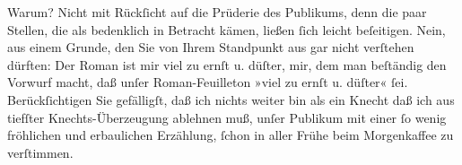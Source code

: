 \pstart
           Warum? Nicht mit Rückſicht auf die Prüderie des Publikums, denn die paar Stellen, die
               als bedenklich in Betracht kämen, ließen ſich leicht beſeitigen. Nein, aus einem
               Grunde, den Sie von Ihrem Standpunkt aus gar nicht verſtehen dürften: Der Roman ist mir viel zu ernſt u.
               düſter, mir, dem man beſtändig den Vorwurf macht, daß unſer Roman-Feuilleton »viel zu
               ernſt u. düſter« ſei. Berückſichtigen Sie gefälligſt, daß ich nichts weiter bin als
               ein Knecht \label{T_L00186-1v}\label{T_L00186-1} daß ich aus
               tiefſter Knechts-Überzeugung ablehnen muß, unſer Publikum mit einer ſo wenig
               fröhlichen und erbaulichen Erzählung, ſchon in aller Frühe beim Morgenkaffee zu
               verſtimmen.\pend
           

